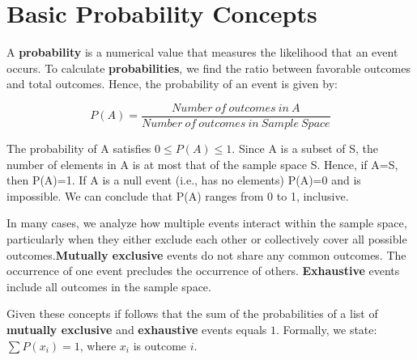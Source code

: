 \documentclass[
  11pt,
  letterpaper,
  DIV=11,
  numbers=noendperiod,
  oneside,
  open=any]{scrreprt}
\begin{document}
\section{Basic Probability Concepts}\label{basic-probability-concepts}

A \textbf{probability} is a numerical value that measures the likelihood
that an event occurs. To calculate \textbf{probabilities}, we find the
ratio between favorable outcomes and total outcomes. Hence, the
probability of an event is given by:

\begin{bsformula}

\[P(A)=\frac{Number\ of\ outcomes\ in\ A}{Number\ of\ outcomes\ in\ Sample \ Space}\]

\end{bsformula}

The probability of A satisfies \(0\leq P(A) \leq1\). Since A is a subset
of S, the number of elements in A is at most that of the sample space S.
Hence, if A=S, then P(A)=1. If A is a null event (i.e., has no elements)
P(A)=0 and is impossible. We can conclude that P(A) ranges from 0 to 1,
inclusive.

In many cases, we analyze how multiple events interact within the sample
space, particularly when they either exclude each other or collectively
cover all possible outcomes.\textbf{Mutually exclusive} events do not
share any common outcomes. The occurrence of one event precludes the
occurrence of others. \textbf{Exhaustive} events include all outcomes in
the sample space.

Given these concepts if follows that the sum of the probabilities of a
list of \textbf{mutually exclusive} and \textbf{exhaustive} events
equals \(1\). Formally, we state: \(\sum P(x_i)=1\), where \(x_i\) is
outcome \(i\).
\end{document}
